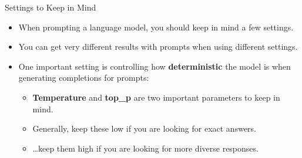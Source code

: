 \begin{frame}{Settings to Keep in Mind}
  \begin{itemize}
    \item When prompting a language model, you should keep in mind a few settings.
    \vspace{0.5em}
    \item You can get very different results with prompts when using different settings.
    \vspace{0.5em}
    \item One important setting is controlling how \textbf{deterministic} the model is when generating completions for prompts:
      \begin{itemize}
        \item \textbf{Temperature} and \textbf{top\_p} are two important parameters to keep in mind.
        \item Generally, keep these low if you are looking for exact answers.
        \item \dots keep them high if you are looking for more diverse responses.
      \end{itemize}
  \end{itemize}
\end{frame}
